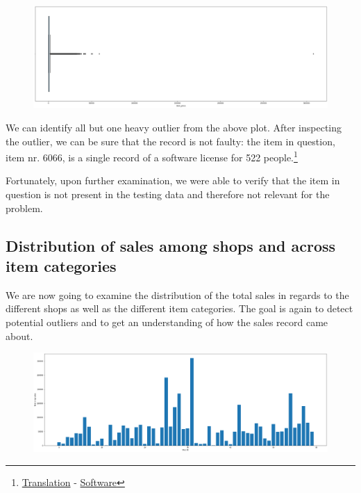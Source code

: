 \begin{figure}[h]
  \centering
  \includegraphics[width=0.9\linewidth]{external_content/graphs/outliers-item_price.png}
  \captionsetup{justification=centering}
  \label{fig:item_price_outliers}
\end{figure}

We can identify all but one heavy outlier from the above plot. After inspecting the outlier, we can be sure that the record is not faulty: the item in question, item nr. 6066, is a single record of a software license for 522 people.\footnote{\href{https://translate.google.com/?sl=ru&tl=en&text=Radmin\%203\%20\%20-\%20522\%20\%D0\%BB\%D0\%B8\%D1\%86.&op=translate }{Translation} - \href{https://www.radmin.com/ordering/}{Software}}

Fortunately, upon further examination, we were able to verify that the item in question is not present in the testing data and therefore not relevant for the problem.

\subsection{Distribution of sales among shops and across item categories}

We are now going to examine the distribution of the total sales in regards to the different shops as well as the different item categories. The goal is again to detect potential outliers and to get an understanding of how the sales record came about.

\begin{figure}[h]
  \centering
  \includegraphics[width=0.82\linewidth]{external_content/graphs/distribution_amongst_shops.png}
  \captionsetup{justification=centering}
  \label{fig:distribution_amongst_shops}
\end{figure}

